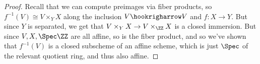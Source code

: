 \begin{proof}
	Recall that we can compute preimages via fiber products, so $f^{-1}(V) \cong V \times_Y X$ along the inclusion $V \hookrigharrow V$ and $f : X \to Y$. But since $Y$ is separated, we get that $V \times_Y X \to V \times_\ZZ X$ is a closed immersion. But since $V,X,\Spec\ZZ$ are all affine, so is the fiber product, and so we've shown that $f^{-1}(V)$ is a closed subscheme of an affine scheme, which is just $\Spec$ of the relevant quotient ring, and thus also affine.
\end{proof}

